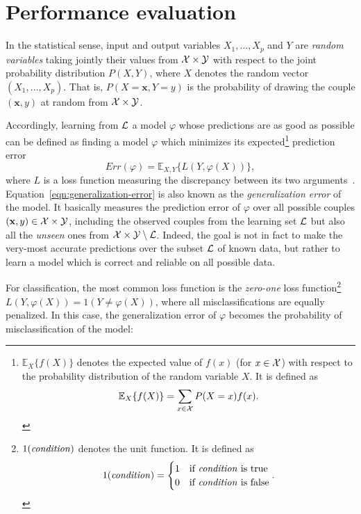\section{Performance evaluation}

In the statistical sense, input and output variables $X_1, ..., X_p$ and $Y$
are \textit{random variables} taking jointly their values from ${\cal X}
\times {\cal Y}$ with respect to the joint probability distribution $P(X, Y)$,
where $X$ denotes the random vector $(X_1, ..., X_p)$. That is,
$P(X=\mathbf{x}, Y=y)$ is the probability of drawing the couple $(\mathbf{x},
y)$ at random from ${\cal X} \times {\cal Y}$.

Accordingly, learning from ${\cal L}$ a model $\varphi$ whose predictions are as good as
possible can be defined as finding a model $\varphi$ which minimizes its
expected\footnote{$\mathbb{E}_X \{f(X)\}$ denotes the expected value of $f(x)$
(for $x \in {\cal X}$) with respect to the probability distribution of the
random variable $X$. It is defined as $$\mathbb{E}_X \{f(X)\} = \sum_{x \in {\cal
X}} P(X=x) f(x).$$} prediction error
\begin{equation}\label{eqn:generalization-error}
Err(\varphi) = \mathbb{E}_{X, Y}\{ L(Y, \varphi(X)) \},
\end{equation}
where $L$ is a loss function measuring the discrepancy between its two
arguments~\citep{geurts:2002}. Equation~\ref{eqn:generalization-error} is also
known as the \textit{generalization error} of the model. It basically measures
the prediction error of $\varphi$ over all possible couples $(\mathbf{x}, y)\in
{\cal X}\times{\cal Y}$, including the observed couples from the learning set
${\cal L}$ but also all the \textit{unseen} ones from ${\cal X}\times{\cal Y}
\setminus {\cal L}$. Indeed, the goal is not in fact to make the very-most accurate
predictions over the subset ${\cal L}$ of known data, but rather to learn a model which
is correct and reliable on all possible data.

For classification, the most common loss function is the \textit{zero-one} loss
function\footnote{$1(\text{\textit{condition}})$ denotes the unit function. It
is defined as
$$1(\text{\textit{condition}}) =
\begin{cases}
1 & \text{if \textit{condition} is true}\\
0 & \text{if \textit{condition} is false}
\end{cases}.
$$} $L(Y, \varphi(X)) = 1(Y \neq \varphi(X))$, where all
misclassifications are equally penalized. In this case, the generalization
error of $\varphi$ becomes the probability of misclassification of the model:

